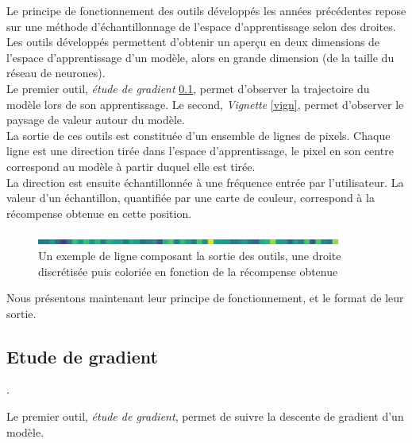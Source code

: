 \documentclass[12pt]{article}
\begin{document}
Le principe de fonctionnement des outils développés les années précédentes repose sur une méthode d’échantillonnage de l’espace d’apprentissage selon des droites. \\

Les outils développés permettent d'obtenir un aperçu en deux dimensions de l'espace d'apprentissage d'un modèle, alors en grande dimension (de la taille du réseau de neurones). \\

Le premier outil, \emph{étude de gradient} \ref{gradient}, permet d'observer la trajectoire du modèle lors de son apprentissage. Le second, \emph{Vignette} \ref{vign}, permet d'observer le paysage de valeur autour du modèle. \\

La sortie de ces outils est constituée d’un ensemble de lignes de pixels. Chaque ligne est une direction tirée dans l’espace d’apprentissage, le pixel en son centre correspond au modèle à partir duquel elle est tirée. \\

La direction est ensuite échantillonnée à une fréquence entrée par l’utilisateur. La valeur d'un échantillon, quantifiée par une carte de couleur, correspond à la récompense obtenue en cette position. \\

\begin{figure}[htp]
    \centering
    \includegraphics[width=10cm]{Images/Ligne}
    \caption{Un exemple de ligne composant la sortie des outils, une droite discrétisée puis coloriée en fonction de la récompense obtenue}
    \label{fig:ligne1}
\end{figure}

Nous présentons maintenant leur principe de fonctionnement, et le format de leur sortie. \\

\subsection{Etude de gradient} \label{gradient}.

Le premier outil, \emph{étude de gradient}, permet de suivre la descente de gradient d’un modèle. \\
\end{document}
